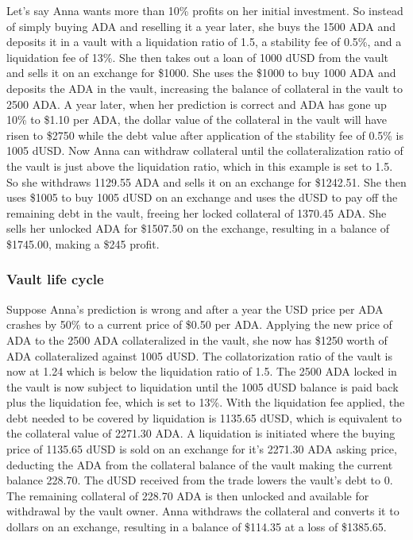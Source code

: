 \documentclass[12pt]{article}
\begin{document}
Let's say Anna wants more than 10\% profits on her initial investment. So instead of simply buying ADA and reselling it a year later, she buys the 1500 ADA and deposits it in a vault with a liquidation ratio of 1.5, a stability fee of 0.5\%, and a liquidation fee of 13\%. She then takes out a loan of 1000 dUSD from the vault and sells it on an exchange for \$1000. She uses the \$1000 to buy 1000 ADA and deposits the ADA in the vault, increasing the balance of collateral in the vault to 2500 ADA. A year later, when her prediction is correct and ADA has gone up 10\% to \$1.10 per ADA, the dollar value of the collateral in the vault will have risen to \$2750 while the debt value after application of the stability fee of 0.5\% is 1005 dUSD. Now Anna can withdraw collateral until the collateralization ratio of the vault is just above the liquidation ratio, which in this example is set to 1.5. So she withdraws 1129.55 ADA and sells it on an exchange for \$1242.51. She then uses \$1005 to buy 1005 dUSD on an exchange and uses the dUSD to pay off the remaining debt in the vault, freeing her locked collateral of 1370.45 ADA. She sells her unlocked ADA for \$1507.50 on the exchange, resulting in a balance of \$1745.00, making a \$245 profit.

	\subsubsection{Vault life cycle}

Suppose Anna's prediction is wrong and after a year the USD price per ADA crashes by 50\% to a current price of \$0.50 per ADA. Applying the new price of ADA to the 2500 ADA collateralized in the vault, she now has \$1250 worth of ADA collateralized against 1005 dUSD. The collatorization ratio of the vault is now at 1.24 which is below the liquidation ratio of 1.5. The 2500 ADA locked in the vault is now subject to liquidation until the 1005 dUSD balance is paid back plus the liquidation fee, which is set to 13\%. With the liquidation fee applied, the debt needed to be covered by liquidation is 1135.65 dUSD, which is equivalent to the collateral value of 2271.30 ADA. A liquidation is initiated where the buying price of 1135.65 dUSD is sold on an exchange for it's 2271.30 ADA asking price, deducting the ADA from the collateral balance of the vault making the current balance 228.70. The dUSD received from the trade lowers the vault's debt to 0. The remaining collateral of 228.70 ADA is then unlocked and available for withdrawal by the vault owner. Anna withdraws the collateral and converts it to dollars on an exchange, resulting in a balance of \$114.35 at a loss of \$1385.65.
\end{document}
